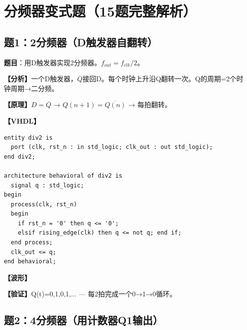 \chapter{分频器变式题（15题完整解析）}

\section{题1：2分频器（D触发器自翻转）}

\textbf{题目}：用D触发器实现2分频器。$f_{out}=f_{clk}/2$。

\begin{solution}[完整解答]

\textbf{【分析】}一个D触发器，$\overline{Q}$接回D。每个时钟上升沿Q翻转一次。Q的周期=2个时钟周期→二分频。

\textbf{【原理】}$D = \overline{Q}$ → $Q(n+1) = \overline{Q(n)}$ → 每拍翻转。

\textbf{【VHDL】}
\begin{lstlisting}
entity div2 is
  port (clk, rst_n : in std_logic; clk_out : out std_logic);
end div2;

architecture behavioral of div2 is
  signal q : std_logic;
begin
  process(clk, rst_n)
  begin
    if rst_n = '0' then q <= '0';
    elsif rising_edge(clk) then q <= not q; end if;
  end process;
  clk_out <= q;
end behavioral;
\end{lstlisting}

\textbf{【波形】}
\begin{center}
\end{center}

\textbf{【验证】}Q(t)=0,1,0,1,... — 每2拍完成一个0→1→0循环。

\end{solution}


\section{题2：4分频器（用计数器Q1输出）}

